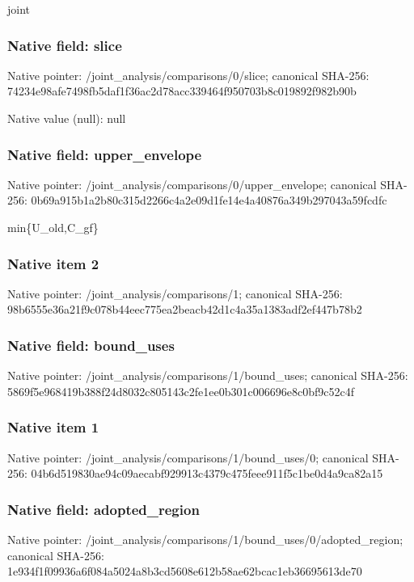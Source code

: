 \documentclass[10pt,a4paper]{article}
\begin{document}
\begingroup\raggedright\sloppy joint\par\endgroup

\subsubsection{Native field: slice}
Native pointer: /joint\_\allowbreak{}analysis/comparisons/0/slice; canonical SHA-256: 74234e98afe7498fb5daf1f36ac2d78acc339464f950703b8c019892f982b90b

Native value (null): null

\subsubsection{Native field: upper\_\allowbreak{}envelope}
Native pointer: /joint\_\allowbreak{}analysis/comparisons/0/upper\_\allowbreak{}envelope; canonical SHA-256: 0b69a915b1a2b80c315d2266c4a2e09d1fe14e4a40876a349b297043a59fcdfc

\begingroup\raggedright\sloppy min\{U\_\allowbreak{}old,\allowbreak{}C\_\allowbreak{}gf\}\par\endgroup

\subsubsection{Native item 2}
Native pointer: /joint\_\allowbreak{}analysis/comparisons/1; canonical SHA-256: 98b6555e36a21f9c078b44eec775ea2beacb42d1c4a35a1383adf2ef447b78b2

\subsubsection{Native field: bound\_\allowbreak{}uses}
Native pointer: /joint\_\allowbreak{}analysis/comparisons/1/bound\_\allowbreak{}uses; canonical SHA-256: 5869f5e968419b388f24d8032c805143c2fe1ee0b301c006696e8c0bf9c52c4f

\subsubsection{Native item 1}
Native pointer: /joint\_\allowbreak{}analysis/comparisons/1/bound\_\allowbreak{}uses/0; canonical SHA-256: 04b6d519830ae94c09aecabf929913c4379c475feee911f5c1be0d4a9ca82a15

\subsubsection{Native field: adopted\_\allowbreak{}region}
Native pointer: /joint\_\allowbreak{}analysis/comparisons/1/bound\_\allowbreak{}uses/0/adopted\_\allowbreak{}region; canonical SHA-256: 1e934f1f09936a6f084a5024a8b3cd5608e612b58ae62bcac1eb36695613de70
\end{document}
